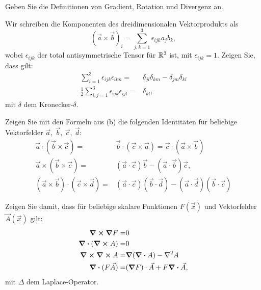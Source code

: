 \begin{Problem}
	\begin{parts}
		\item Geben Sie die Definitionen von Gradient, Rotation und Divergenz an.
		\item Wir schreiben die Komponenten des dreidimensionalen Vektorprodukts als
			\[
				(\vec{a}\times \vec{b})_i=\sum_{j,k=1}^3 \epsilon_{ijk}a_jb_k,\] 
				wobei $\epsilon_{ijk}$ der total antisymmetrische Tensor f\"{u}r $\mathbb{R}^3$ ist, mit $\epsilon_{ijk}=1$. Zeigen Sie, dass gilt:
				\begin{align*}
					\sum_{i=1}^3 \epsilon_{ijk}\epsilon_{ilm}=&\delta_{jl}\delta_{km}-\delta_{jm}\delta_{kl}\\
					\frac{1}{2}\sum_{i,j=1}^3 \epsilon_{ijk}\epsilon_{ijl}=&\delta_{kl},
				\end{align*}
				mit $\delta$ dem Kronecker-$\delta$.
			\item Zeigen Sie mit den Formeln aus (b) die folgenden Identitäten für beliebige Vektorfelder $\vec{a},~\vec{b},~\vec{c},~\vec{d}$:
				\begin{align*}
					\vec{a}\cdot(\vec{b}\times\vec{c})=&\vec{b}\cdot (\vec{c}\times \vec{a})=\vec{c}\cdot (\vec{a}\times \vec{b})\\
					\vec{a}\times(\vec{b}\times\vec{c})=&(\vec{a}\cdot\vec{c})\vec{b}-(\vec{a}\cdot\vec{b})\vec{c},\\
					(\vec{a}\times\vec{b})\cdot(\vec{c}\times\vec{d})=&(\vec{a}\cdot\vec{c})(\vec{b}\cdot\vec{d})-(\vec{a}\cdot\vec{d})(\vec{b}\cdot\vec{c})
				\end{align*}
			\item Zeigen Sie damit, dass f\"{u}r beliebige skalare Funktionen $F(\vec{x})$ und Vektorfelder $\vec{A}(\vec{x})$ gilt:
				\begin{align*}
					\curl{\grad{F}}=&0\\
					\div{(\curl{A})}=&0\\
					\curl{\curl{A}}=&\grad{(\div{A})}-\laplacian{A}\\
					\div{(F\vec{A})}=&(\grad{F})\cdot\vec{A}+F\div{\vec{A}},
				\end{align*}
				mit $\Delta$ dem Laplace-Operator.
	\end{parts}
\end{Problem} 
